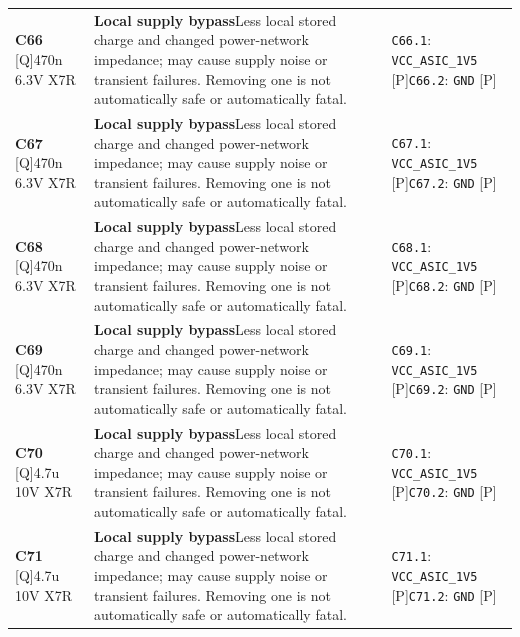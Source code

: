\documentclass[11pt,a4paper]{article}
\begin{document}
\begin{longtable}{@{}P{27mm}P{77mm}P{62mm}@{}}
\textbf{C66} [Q]\newline 470n 6.3V X7R & \textbf{Local supply bypass}\newline Less local stored charge and changed power-network impedance; may cause supply noise or transient failures. Removing one is not automatically safe or automatically fatal. & \nolinkurl{C66.1}: \nolinkurl{VCC_ASIC_1V5} [P]\newline \nolinkurl{C66.2}: \nolinkurl{GND} [P] \\
\textbf{C67} [Q]\newline 470n 6.3V X7R & \textbf{Local supply bypass}\newline Less local stored charge and changed power-network impedance; may cause supply noise or transient failures. Removing one is not automatically safe or automatically fatal. & \nolinkurl{C67.1}: \nolinkurl{VCC_ASIC_1V5} [P]\newline \nolinkurl{C67.2}: \nolinkurl{GND} [P] \\
\textbf{C68} [Q]\newline 470n 6.3V X7R & \textbf{Local supply bypass}\newline Less local stored charge and changed power-network impedance; may cause supply noise or transient failures. Removing one is not automatically safe or automatically fatal. & \nolinkurl{C68.1}: \nolinkurl{VCC_ASIC_1V5} [P]\newline \nolinkurl{C68.2}: \nolinkurl{GND} [P] \\
\textbf{C69} [Q]\newline 470n 6.3V X7R & \textbf{Local supply bypass}\newline Less local stored charge and changed power-network impedance; may cause supply noise or transient failures. Removing one is not automatically safe or automatically fatal. & \nolinkurl{C69.1}: \nolinkurl{VCC_ASIC_1V5} [P]\newline \nolinkurl{C69.2}: \nolinkurl{GND} [P] \\
\textbf{C70} [Q]\newline 4.7u 10V X7R & \textbf{Local supply bypass}\newline Less local stored charge and changed power-network impedance; may cause supply noise or transient failures. Removing one is not automatically safe or automatically fatal. & \nolinkurl{C70.1}: \nolinkurl{VCC_ASIC_1V5} [P]\newline \nolinkurl{C70.2}: \nolinkurl{GND} [P] \\
\textbf{C71} [Q]\newline 4.7u 10V X7R & \textbf{Local supply bypass}\newline Less local stored charge and changed power-network impedance; may cause supply noise or transient failures. Removing one is not automatically safe or automatically fatal. & \nolinkurl{C71.1}: \nolinkurl{VCC_ASIC_1V5} [P]\newline \nolinkurl{C71.2}: \nolinkurl{GND} [P] \\

\end{longtable}
\end{document}
